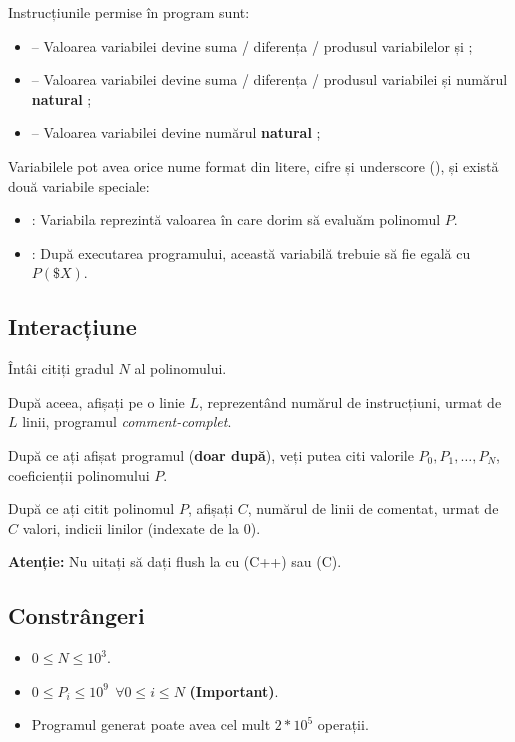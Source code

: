 \documentclass[12pt,a4paper]{article}
\begin{document}
Instrucțiunile permise în program sunt:
\begin{itemize}
    \item {} -- Valoarea variabilei  devine suma / diferența / produsul variabilelor  și ;
    \item {} -- Valoarea variabilei  devine suma / diferența / produsul variabilei  și numărul \textbf{natural} ;
    \item {} -- Valoarea variabilei  devine numărul \textbf{natural} ;
\end{itemize}

Variabilele pot avea orice nume format din litere, cifre și underscore (), și există două variabile speciale:
\begin{itemize}
    \item {}: Variabila reprezintă valoarea în care dorim să evaluăm polinomul $P$.
    \item {}: După executarea programului, această variabilă trebuie să fie egală cu $P(\$X)$.
\end{itemize}


\subsection*{Interacțiune}

Întâi citiți gradul $N$ al polinomului.

După aceea, afișați pe o linie $L$, reprezentând numărul de instrucțiuni, urmat de $L$ linii, programul \textit{comment-complet}.

După ce ați afișat programul (\textbf{doar după}), veți putea citi valorile $P_0, P_1, \dots, P_N$, coeficienții polinomului $P$.

După ce ați citit polinomul $P$, afișați $C$, numărul de linii de comentat, urmat de $C$ valori, indicii linilor (indexate de la $0$).

\textbf{Atenție:} Nu uitați să dați flush la  cu  (C++) sau  (C).

\subsection*{Constrângeri}

\begin{itemize}
    \item $0 \leq N \leq 10^3$.
    \item $0 \leq P_i \leq 10^9 \ \ \forall 0 \leq i \leq N$  \textbf{(Important)}.
    \item Programul generat poate avea cel mult $2 * 10^5$ operații.
\end{itemize}
\end{document}
